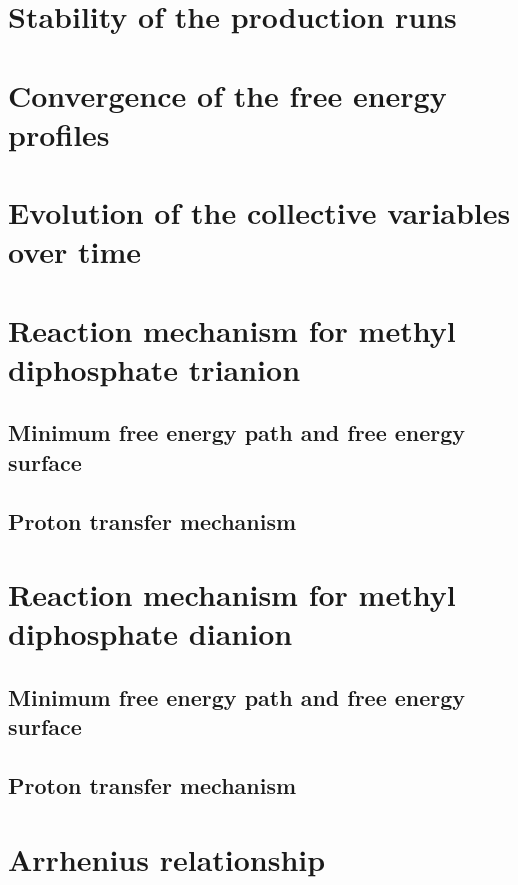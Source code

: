 
\section{Stability of the production runs}




\section{Convergence of the free energy profiles}




\section{Evolution of the collective variables over time}





\section{Reaction mechanism for methyl diphosphate trianion}
\subsection{Minimum free energy path and free energy surface}
\subsection{Proton transfer mechanism}




\section{Reaction mechanism for methyl diphosphate dianion}
\subsection{Minimum free energy path and free energy surface}
\subsection{Proton transfer mechanism}




\section{Arrhenius relationship}




